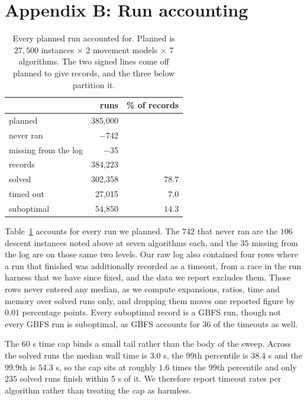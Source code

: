\documentclass[letterpaper]{article} %
\begin{document}
\section{Appendix B: Run accounting}\label{app:b}

\begin{table}[t] \centering\small \setlength{\tabcolsep}{4pt}
  \begin{tabular}{lrr} \toprule & runs & \% of records \\ \midrule planned & 385{,}000 & \\ \quad never ran & $-$742 & \\ \quad missing from the log & $-$35 & \\ \midrule records & 384{,}223 & \\ \addlinespace[2pt] \quad solved & 302{,}358 & $78.7$ \\ \quad timed out & 27{,}015 & $7.0$ \\ \quad suboptimal & 54{,}850 & $14.3$ \\ \bottomrule
  \end{tabular}
  \caption{Every planned run accounted for. Planned is $27{,}500$ instances $\times$ 2 movement models $\times$ 7 algorithms. The two signed lines come off planned to give records, and the three below partition it.}\label{tab:runs}
\end{table}

Table~\ref{tab:runs} accounts for every run we planned. The $742$ that never ran are the $106$ descent instances noted above at seven algorithms each, and the $35$ missing from the log are on those same two levels. Our raw log also contained four rows where a run that finished was additionally recorded as a timeout, from a race in the run harness that we have since fixed, and the data we report excludes them. Those rows never entered any median, as we compute expansions, ratios, time and memory over solved runs only, and dropping them moves one reported figure by $0.01$ percentage points. Every suboptimal record is a GBFS run, though not every GBFS run is suboptimal, as GBFS accounts for $36$ of the timeouts as well.

The 60 s time cap binds a small tail rather than the body of the sweep. Across the solved runs the median wall time is $3.0$ s, the 99th percentile is $38.4$ s and the 99.9th is $54.3$ s, so the cap sits at roughly $1.6$ times the 99th percentile and only $235$ solved runs finish within 5 s of it. We therefore report timeout rates per algorithm rather than treating the cap as harmless.
\end{document}

